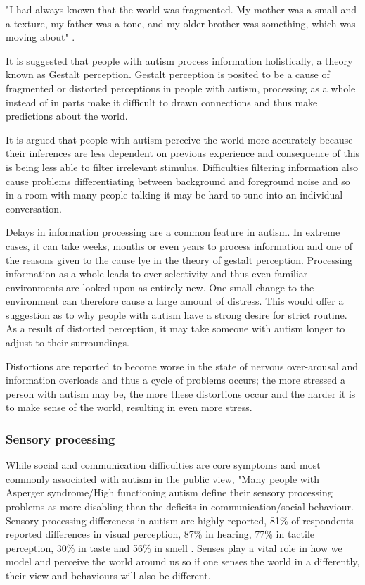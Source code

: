 \documentclass[11pt]{report}
\begin{document}
 "I had always known that the world was fragmented. My mother was a small and a texture, my father was a tone, and my older brother was something, which was moving about" \cite{williams1992}. 

It is suggested that people with autism process information holistically, a theory known as Gestalt perception. Gestalt perception is posited to be a cause of fragmented or distorted perceptions\cite{olga} in people with autism, processing as a whole instead of in parts make it difficult to drawn connections and thus make predictions about the world.

It is argued that people with autism perceive the world more accurately because their inferences are less dependent on previous experience\cite{bayes} and consequence of this is being less able to filter irrelevant stimulus. Difficulties filtering information also cause problems differentiating between background and foreground noise and so in a room with many people talking it may be hard to tune into an individual conversation. 

Delays in information processing are a common feature in autism. In extreme cases, it can take weeks, months or even years to process information and one of the reasons given to the cause lye in the theory of gestalt perception. Processing information as a whole leads to over-selectivity and thus even familiar environments are looked upon as entirely new. One small change to the environment can therefore cause a large amount of distress.  This would offer a suggestion as to why people with autism have a strong desire for strict routine. As a result of distorted perception, it may take someone with autism longer to adjust to their surroundings. 

Distortions are reported to become worse in the state of nervous over-arousal and information overloads\cite{olgab} and thus a cycle of problems occurs; the more stressed a person with autism may be, the more these distortions occur and the harder it is to make sense of the world, resulting in even more stress.


\subsubsection{Sensory processing}

While social and communication difficulties are core symptoms and most commonly associated with autism in the public view, "Many people with Asperger syndrome/High functioning autism define their sensory processing problems as more disabling than the deficits in communication/social behaviour\cite{olgab}. Sensory processing differences in autism are highly reported, 81\% of respondents reported differences in visual perception, 87\% in hearing, 77\% in tactile perception, 30\% in taste and 56\% in smell \cite{olgab}. Senses play a vital role in how we model and perceive the world around us so if one senses the world in a differently, their view and behaviours will also be different. 
\end{document}
